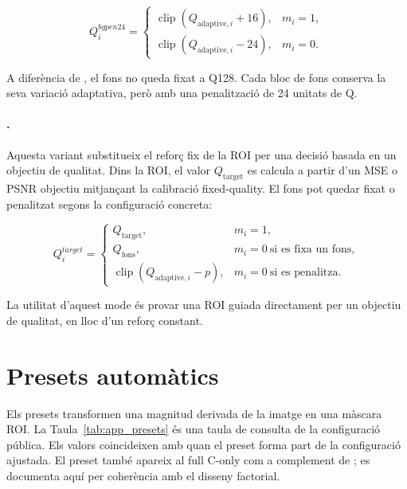 \begin{equation}
Q_i^{bgpen24}=
\begin{cases}
\operatorname{clip}(Q_{\mathrm{adaptive},i}+16), & m_i=1,\\
\operatorname{clip}(Q_{\mathrm{adaptive},i}-24), & m_i=0.
\end{cases}
\end{equation}

A diferència de , el fons no queda fixat a Q128. Cada bloc
de fons conserva la seva variació adaptativa, però amb una penalització de 24
unitats de Q.

\paragraph{.}
Aquesta variant substitueix el reforç fix de la ROI per una decisió basada en
un objectiu de qualitat. Dins la ROI, el valor $Q_{\mathrm{target}}$ es calcula
a partir d'un MSE o PSNR objectiu mitjançant la calibració fixed-quality. El
fons pot quedar fixat o penalitzat segons la configuració concreta:

\begin{equation}
Q_i^{target}=
\begin{cases}
Q_{\mathrm{target}}, & m_i=1,\\
Q_{\mathrm{fons}}, & m_i=0\ \text{si es fixa un fons},\\
\operatorname{clip}(Q_{\mathrm{adaptive},i}-p), & m_i=0\ \text{si es penalitza}.
\end{cases}
\end{equation}

La utilitat d'aquest mode és provar una ROI guiada directament per un objectiu
de qualitat, en lloc d'un reforç constant.

\section{Presets automàtics}

Els presets transformen una magnitud derivada de la imatge en una màscara ROI.
La Taula~\ref{tab:app_presets} és una taula de consulta de la configuració
pública. Els valors coincideixen amb 
quan el preset forma part de la configuració ajustada. El preset 
també apareix al full C-only com a complement de ; es
documenta aquí per coherència amb el disseny factorial.


